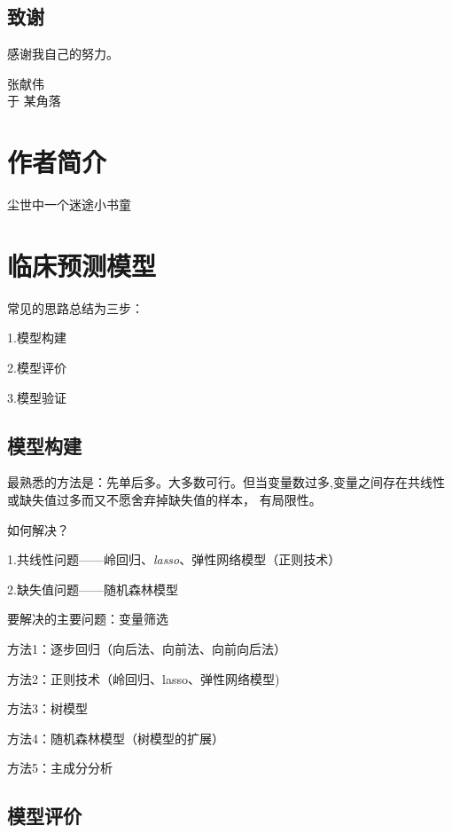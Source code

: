 \documentclass[]{ctexbook}
\begin{document}
\hypertarget{ux81f4ux8c22}{%
\section*{致谢}\label{ux81f4ux8c22}}


感谢我自己的努力。

\begin{flushright}
张献伟\\
于 某角落
\end{flushright}

\hypertarget{author}{%
\chapter*{作者简介}\label{author}}


尘世中一个迷途小书童

\mainmatter

\hypertarget{ux4e34ux5e8aux9884ux6d4bux6a21ux578b}{%
\chapter{临床预测模型}\label{ux4e34ux5e8aux9884ux6d4bux6a21ux578b}}

常见的思路总结为三步：

1.模型构建

2.模型评价

3.模型验证

\hypertarget{ux6a21ux578bux6784ux5efa}{%
\section{模型构建}\label{ux6a21ux578bux6784ux5efa}}

最熟悉的方法是：先单后多。大多数可行。但当变量数过多,变量之间存在共线性或缺失值过多而又不愿舍弃掉缺失值的样本， 有局限性。

如何解决？

1.共线性问题------岭回归、\emph{lasso}、弹性网络模型（正则技术）

2.缺失值问题------随机森林模型

要解决的主要问题：变量筛选

方法1：逐步回归（向后法、向前法、向前向后法）

方法2：正则技术（岭回归、lasso、弹性网络模型)

方法3：树模型

方法4：随机森林模型（树模型的扩展）

方法5：主成分分析

\hypertarget{ux6a21ux578bux8bc4ux4ef7}{%
\section{模型评价}\label{ux6a21ux578bux8bc4ux4ef7}}
\end{document}

